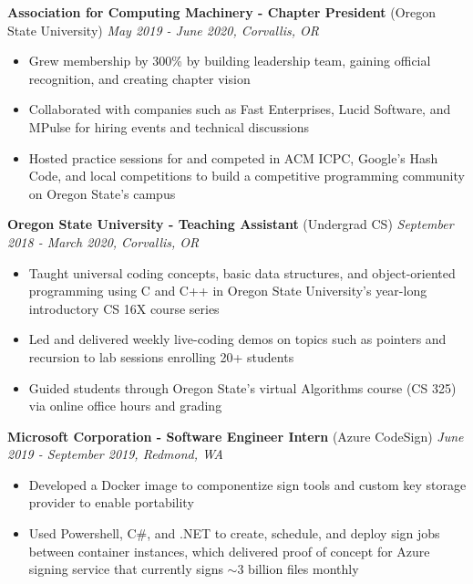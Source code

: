 \documentclass[11pt,letterpaper,ragged2e,withhyper]{dodiresume}
\begin{document}
\vskip 0.1in

\noindent \normalsize \textbf{Association for Computing Machinery - Chapter President} \footnotesize (Oregon State University) \hfill \small \textit{May 2019 - June 2020, Corvallis, OR}
\begin{itemize}
	\item Grew membership by 300\% by building leadership team, gaining official recognition, and creating chapter vision
	\item Collaborated with companies such as Fast Enterprises, Lucid Software, and MPulse for hiring events and technical discussions
	\item Hosted practice sessions for and competed in ACM ICPC, Google’s Hash Code, and local competitions to build a competitive programming community on Oregon State's campus
\end{itemize}

\vskip 0.1in

\noindent \normalsize \textbf{Oregon State University - Teaching Assistant} \footnotesize (Undergrad CS) \hfill \small \textit{September 2018 - March 2020, Corvallis, OR}
\begin{itemize}
	\item Taught universal coding concepts, basic data structures, and object-oriented programming using C and C++ in Oregon State University’s year-long introductory CS 16X course series
	\item Led and delivered weekly live-coding demos on topics such as pointers and recursion to lab sessions enrolling 20+ students
	\item Guided students through Oregon State's virtual Algorithms course (CS 325) via online office hours and grading
\end{itemize}

\vskip 0.1in

\noindent \normalsize \textbf{Microsoft Corporation - Software Engineer Intern} \footnotesize (Azure CodeSign) \hfill \small \textit{June 2019 - September 2019, Redmond, WA}
\begin{itemize}
	\item Developed a Docker image to componentize sign tools and custom key storage provider to enable portability
	\item Used Powershell, C\#, and .NET to create, schedule, and deploy sign jobs between container instances, which delivered proof of concept for Azure signing service that currently signs $\sim$3 billion files monthly
\end{itemize}
\end{document}
